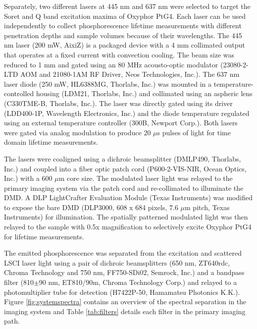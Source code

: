 Separately, two different lasers at 445 nm and 637 nm were selected to target the Soret and Q band excitation maxima of Oxyphor PtG4. Each laser can be used independently to collect phosphorescence lifetime measurements with different penetration depths and sample volumes because of their wavelengths. The 445 nm laser (200 mW, AixiZ) is a packaged device with a 4 mm collimated output that operates at a fixed current with convection cooling. The beam size was reduced to 1 mm and gated using an 80 MHz acousto-optic modulator (23080-2-LTD AOM and 21080-1AM RF Driver, Neos Technologies, Inc.). The 637 nm laser diode (250 mW, HL6388MG, Thorlabs, Inc.) was mounted in a temperature-controlled housing (LDM21, Thorlabs, Inc.) and collimated using an aspheric lens (C330TME-B, Thorlabs, Inc.). The laser was directly gated using its driver (LDD400-1P, Wavelength Electronics, Inc.) and the diode temperature regulated using an external temperature controller (300B, Newport Corp.). Both lasers were gated via analog modulation to produce 20 $\mu$s pulses of light for time domain lifetime measurements.

The lasers were coaligned using a dichroic beamsplitter (DMLP490, Thorlabs, Inc.) and coupled into a fiber optic patch cord (P600-2-VIS-NIR, Ocean Optics, Inc.) with a 600 $\mu$m core size. The modulated laser light was relayed to the primary imaging system via the patch cord and re-collimated to illuminate the DMD. A DLP LightCrafter Evaluation Module (Texas Instruments) was modified to expose the bare DMD (DLP3000, 608 x 684 pixels, 7.6 $\mu$m pitch, Texas Instruments) for illumination. The spatially patterned modulated light was then relayed to the sample with 0.5x magnification to selectively excite Oxyphor PtG4 for lifetime measurements.

The emitted phosphorescence was separated from the excitation and scattered LSCI laser light using a pair of dichroic beamsplitters (650 nm, ZT640rdc, Chroma Technology and 750 nm, FF750-SDi02, Semrock, Inc.) and a bandpass filter (810$\pm$90 nm, ET810/90m, Chroma Technology Corp.) and relayed to a photomultiplier tube for detection (H7422P-50, Hamamatsu Photonics K.K.). Figure \ref{fig:systemspectra} contains an overview of the spectral separation in the imaging system and Table \ref{tab:filters} details each filter in the primary imaging path.

